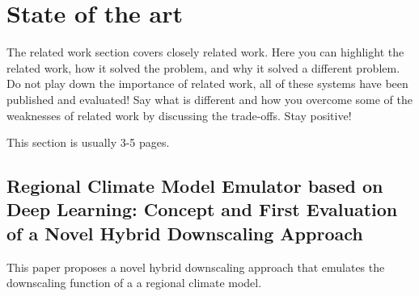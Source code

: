 \documentclass[a4paper,11pt,oneside]{report}
\begin{document}
\chapter{State of the art}

The related work section covers closely related work. Here you can highlight
the related work, how it solved the problem, and why it solved a different
problem. Do not play down the importance of related work, all of these
systems have been published and evaluated! Say what is different and how
you overcome some of the weaknesses of related work by discussing the 
trade-offs. Stay positive!

This section is usually 3-5 pages.

\section{Regional Climate Model Emulator based on Deep Learning: Concept and First Evaluation of a Novel Hybrid Downscaling Approach \cite{Doury}}
This paper proposes a novel hybrid downscaling approach that emulates the downscaling function of a a regional climate model.
\end{document}
